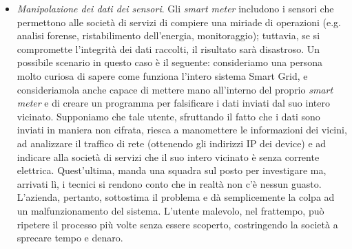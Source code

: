 \begin{itemize}
\item \textit{Manipolazione dei dati dei sensori}. Gli \textit{smart meter} includono i sensori che permettono alle società di servizi di compiere una miriade di operazioni (e.g. analisi forense, ristabilimento dell'energia, monitoraggio); tuttavia, se si compromette l'integrità dei dati raccolti, il risultato sarà disastroso. Un possibile scenario in questo caso è il seguente: consideriamo una persona molto curiosa di sapere come funziona l'intero sistema Smart Grid, e consideriamola anche capace di mettere mano all'interno del proprio \textit{smart meter} e di creare un programma per falsificare i dati inviati dal suo intero vicinato. Supponiamo che tale utente, sfruttando il fatto che i dati sono inviati in maniera non cifrata, riesca a manomettere le informazioni dei vicini, ad analizzare il traffico di rete (ottenendo gli indirizzi IP dei device) e ad indicare alla società di servizi che il suo intero vicinato è senza corrente elettrica. Quest'ultima, manda una squadra sul posto per investigare ma, arrivati lì, i tecnici si rendono conto che in realtà non c'è nessun guasto. L'azienda, pertanto, sottostima il problema e dà semplicemente la colpa ad un malfunzionamento del sistema. L'utente malevolo, nel frattempo, può ripetere il processo più volte senza essere scoperto, costringendo la società a sprecare tempo e denaro.
\end{itemize}

